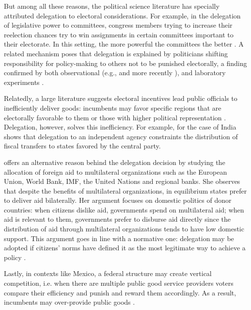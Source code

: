 \documentclass[12pt]{amsart}
\numberwithin{equation}{section}
\theoremstyle{definition}
\theoremstyle{definition}
\theoremstyle{definition}
\begin{document}

 But among all these reasons, the political science literature has specially attributed delegation to electoral considerations. For example, in the delegation of legislative power to committees, congress members trying to increase their reelection chances try to win assignments in certain committees important to their electorate. In this setting, the more powerful the committees the better \citet{mccubbins_1991}. A related mechanism poses that delegation is explained by politicians shifting responsibility for policy-making to others not to be punished electorally, a finding confirmed by both observational (e.g., \citet{fiorina_1982} and more recently \citep{loftis_2014}),  and laboratory experiments \citep{bartling_fischbacher_2012}. 
 
 Relatedly, a large literature suggests electoral incentives lead public officials to inefficiently deliver goods: incumbents may favor specific regions that are electorally favorable to them \citep{schady_2000, Miguel_zaidi_2003, cole_2004} or those with higher political representation  \citep{wright_1974, porto_2001, ansolabehere_etal_2002}. Delegation, however, solves this inefficiency. For example, for the case of India \citet{khemani_2007} shows that delegation to an independent agency constraints the distribution of fiscal transfers to states favored by the central party. 
 
 \citet{milner_2004} offers an alternative reason behind the delegation decision by studying the allocation of foreign aid to multilateral organizations such as the European Union, World Bank, IMF, the United Nations and regional banks. She observes that despite the benefits of multilateral organizations, in equilibrium states prefer to deliver aid bilaterally. Her argument focuses on domestic politics of donor countries: when citizens dislike aid, governments spend on multilateral aid; when aid is relevant to them, governments prefer to disburse aid directly since the distribution of aid through multilateral organizations tends to have low domestic support. This argument goes in line with a normative one: delegation may be adopted if citizens’ norms have defined it as the most legitimate way to achieve a policy \citep{finnemore_1996, ruggie_1993, milner_2011}.

Lastly, in contexts like Mexico, a federal structure may create vertical competition, i.e. when there are multiple public good service providers voters compare their efficiency and punish and reward them accordingly. As a result, incumbents may over-provide public goods \citep{salmon_1987, Breton_1996, treisman_2000}.  
 
\end{document}
